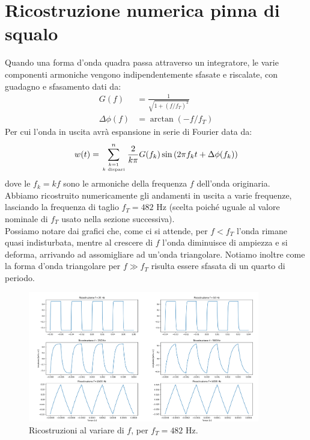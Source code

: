 \documentclass{article}[a4paper, oneside,11pt]
\begin{document}
\section{Ricostruzione numerica pinna di squalo}
    Quando una forma d'onda quadra passa attraverso un integratore, le varie componenti armoniche vengono indipendentemente sfasate e riscalate, con guadagno e sfasamento dati da:
    \begin{align*}
        G(f) &= \frac{1}{\sqrt{1+(f/f_T)^2}}\\
        \Delta\phi(f) &= \arctan(-f/f_T)
    \end{align*}
    Per cui l'onda in uscita avrà espansione in serie di Fourier data da:
    \begin{equation}\label{eq-pinna}
        w(t) = \sum_{{k=1}\atop{k \text{ dispari}}}^n \frac{2}{k\pi} G(f_k) \sin\left(2\pi f_k t + \Delta\phi(f_k)\right)
    \end{equation}
    dove le $f_k = kf$ sono le armoniche della frequenza $f$ dell'onda originaria.\\ Abbiamo ricostruito numericamente gli andamenti in uscita a varie frequenze, lasciando la frequenza di taglio $f_T = 482$ Hz (scelta poiché uguale al valore nominale di $f_T$ usato nella sezione successiva).\\
    Possiamo notare dai grafici che, come ci si attende, per $f<f_T$ l'onda rimane quasi indisturbata, mentre al crescere di $f$ l'onda diminuisce di ampiezza e si deforma, arrivando ad assomigliare ad un'onda triangolare. Notiamo inoltre come la forma d'onda triangolare per $f\gg f_T$ risulta essere sfasata di un quarto di periodo.
    \begin{figure}[H]
        \centering
        \includegraphics[width=0.9\textwidth]{img/Ricostruzione_pinna.png}
        \caption{Ricostruzioni al variare di $f$, per $f_T = 482$ Hz.}
    \end{figure}
\end{document}
